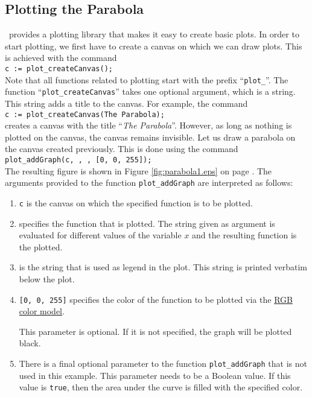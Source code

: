 \subsection{Plotting the Parabola}
\setlx\ provides a plotting library that makes it easy to create basic plots. In order to start
plotting, we first have to create a canvas on which we can draw plots.  This is achieved with
the command
\\[0.2cm]
\hspace*{1.3cm}
\texttt{c := plot\_createCanvas();}
\\[0.2cm]
Note that all functions related to plotting start with the prefix ``\texttt{plot\_}''.  The
function ``\texttt{plot\_createCanvas}'' takes one optional argument, which is a string.  This
string adds a title to the canvas.  For example, the command 
\\[0.2cm]
\hspace*{1.3cm}
\texttt{c := plot\_createCanvas(The Parabola);} 
\\[0.2cm]
creates a canvas with the title ``\textsl{The Parabola}''.  However, as long as nothing is
plotted on the canvas, the canvas remains invisible.  Let us draw a parabola on the canvas
created previously.  This is done using the command
\\[0.2cm]
\hspace*{1.3cm}
\texttt{plot\_addGraph(c, , , [0, 0, 255]);}
\\[0.2cm]
The resulting figure is shown in Figure \ref{fig:parabola1.eps} on page \pageref{fig:parabola1.eps}.
The arguments provided to the function \texttt{plot\_addGraph} are interpreted as follows:
\begin{enumerate}
\item \texttt{c} is the canvas on which the specified function is to be plotted.
\item \texttt{} specifies the function that is plotted.  The string given as argument
      is evaluated for different values of the variable $x$ and the resulting function is the
      plotted. 
\item \texttt{} is the string that is used as legend in the plot.  This string
      is printed verbatim below the plot.
\item \texttt{[0, 0, 255]} specifies the color of the function to be plotted via the 
      \href{https://en.wikipedia.org/wiki/RGB_color_model}{RGB color model}.

      This parameter is optional.  If it is not specified, the graph will be plotted black.
\item There is a final optional parameter to the function \texttt{plot\_addGraph} that is not
      used in this example.  This parameter needs to be a Boolean value.  If this value is
      \texttt{true}, then the area under the curve is filled with the specified color.
\end{enumerate}

